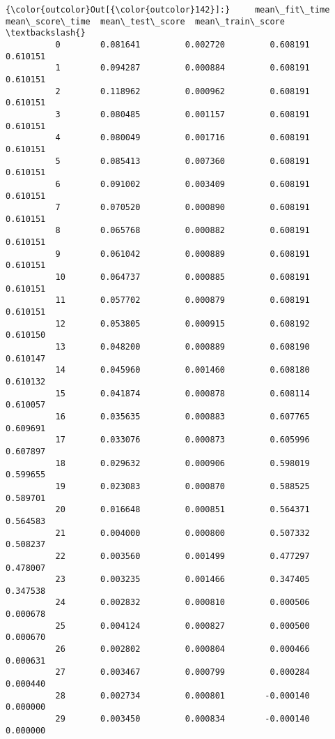 \documentclass[11pt]{article}
\begin{document}
            \begin{Verbatim}[commandchars=\\\{\}]
{\color{outcolor}Out[{\color{outcolor}142}]:}     mean\_fit\_time  mean\_score\_time  mean\_test\_score  mean\_train\_score  \textbackslash{}
          0        0.081641         0.002720         0.608191          0.610151   
          1        0.094287         0.000884         0.608191          0.610151   
          2        0.118962         0.000962         0.608191          0.610151   
          3        0.080485         0.001157         0.608191          0.610151   
          4        0.080049         0.001716         0.608191          0.610151   
          5        0.085413         0.007360         0.608191          0.610151   
          6        0.091002         0.003409         0.608191          0.610151   
          7        0.070520         0.000890         0.608191          0.610151   
          8        0.065768         0.000882         0.608191          0.610151   
          9        0.061042         0.000889         0.608191          0.610151   
          10       0.064737         0.000885         0.608191          0.610151   
          11       0.057702         0.000879         0.608191          0.610151   
          12       0.053805         0.000915         0.608192          0.610150   
          13       0.048200         0.000889         0.608190          0.610147   
          14       0.045960         0.001460         0.608180          0.610132   
          15       0.041874         0.000878         0.608114          0.610057   
          16       0.035635         0.000883         0.607765          0.609691   
          17       0.033076         0.000873         0.605996          0.607897   
          18       0.029632         0.000906         0.598019          0.599655   
          19       0.023083         0.000870         0.588525          0.589701   
          20       0.016648         0.000851         0.564371          0.564583   
          21       0.004000         0.000800         0.507332          0.508237   
          22       0.003560         0.001499         0.477297          0.478007   
          23       0.003235         0.001466         0.347405          0.347538   
          24       0.002832         0.000810         0.000506          0.000678   
          25       0.004124         0.000827         0.000500          0.000670   
          26       0.002802         0.000804         0.000466          0.000631   
          27       0.003467         0.000799         0.000284          0.000440   
          28       0.002734         0.000801        -0.000140          0.000000   
          29       0.003450         0.000834        -0.000140          0.000000   
          

\end{Verbatim}
\end{document}
